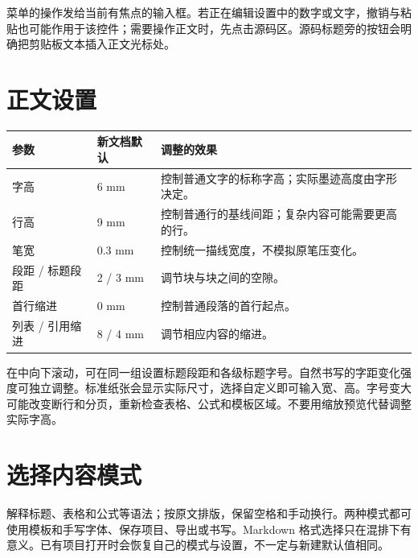菜单的操作发给当前有焦点的输入框。若正在编辑设置中的数字或文字，撤销与粘贴也可能作用于该控件；需要操作正文时，先点击源码区。源码标题旁的按钮会明确把剪贴板文本插入正文光标处。

\section{正文设置}
\par\noindent\begin{tabularx}{\linewidth}{@{}P{33mm}P{23mm}Y@{}}
\toprule
参数 & 新文档默认 & 调整的效果\\\midrule
字高 & 6 mm & 控制普通文字的标称字高；实际墨迹高度由字形决定。\\
行高 & 9 mm & 控制普通行的基线间距；复杂内容可能需要更高的行。\\
笔宽 & 0.3 mm & 控制统一描线宽度，不模拟原笔压变化。\\
段距 / 标题段距 & 2 / 3 mm & 调节块与块之间的空隙。\\
首行缩进 & 0 mm & 控制普通段落的首行起点。\\
列表 / 引用缩进 & 8 / 4 mm & 调节相应内容的缩进。\\
\bottomrule
\end{tabularx}

在中向下滚动，可在同一组设置标题段距和各级标题字号。自然书写的字距变化强度可独立调整。标准纸张会显示实际尺寸，选择自定义即可输入宽、高。字号变大可能改变断行和分页，重新检查表格、公式和模板区域。不要用缩放预览代替调整实际字高。

\section{选择内容模式}
解释标题、表格和公式等语法；按原文排版，保留空格和手动换行。两种模式都可使用模板和手写字体、保存项目、导出或书写。Markdown 格式选择只在混排下有意义。已有项目打开时会恢复自己的模式与设置，不一定与新建默认值相同。
